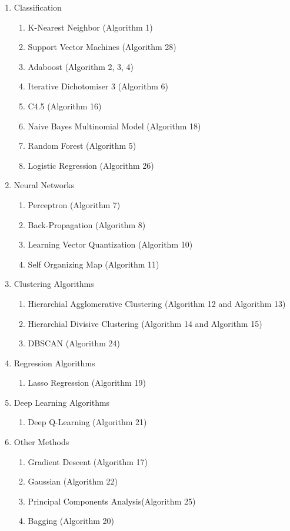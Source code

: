 \documentclass[a4paper]{article}
\begin{document}
\begin{enumerate}
\item Classification 
	\begin{enumerate}
	\item  K-Nearest Neighbor (Algorithm 1)
	\item Support Vector Machines (Algorithm 28)
	\item Adaboost (Algorithm 2, 3, 4)
	\item Iterative Dichotomiser 3 (Algorithm 6)
	\item C4.5 (Algorithm 16)
	\item Naive Bayes Multinomial Model (Algorithm 18)
	\item  Random Forest (Algorithm 5)
	\item Logistic Regression (Algorithm 26)
	\end{enumerate}
 

	
	
\item Neural Networks
\begin{enumerate}
	\item Perceptron (Algorithm 7)
	\item Back-Propagation (Algorithm 8) 
	\item Learning Vector Quantization (Algorithm 10)
	\item Self Organizing Map (Algorithm 11)
	
	
\end{enumerate}	

\item Clustering Algorithms
\begin{enumerate}
   \item Hierarchial Agglomerative Clustering (Algorithm 12 and Algorithm 13)
    \item Hierarchial Divisive Clustering (Algorithm 14 and Algorithm 15)
    \item DBSCAN (Algorithm 24)
\end{enumerate}

\item Regression Algorithms
\begin{enumerate}
   \item Lasso Regression (Algorithm 19)
 
\end{enumerate}

\item Deep Learning Algorithms
\begin{enumerate}
   \item Deep Q-Learning (Algorithm 21)
\end{enumerate}


\item Other Methods
\begin{enumerate}
   \item Gradient Descent (Algorithm 17)
   \item Gaussian (Algorithm 22)
   \item Principal Components Analysis(Algorithm 25)
   \item Bagging (Algorithm 20)
\end{enumerate}

\end{enumerate}
\end{document}
